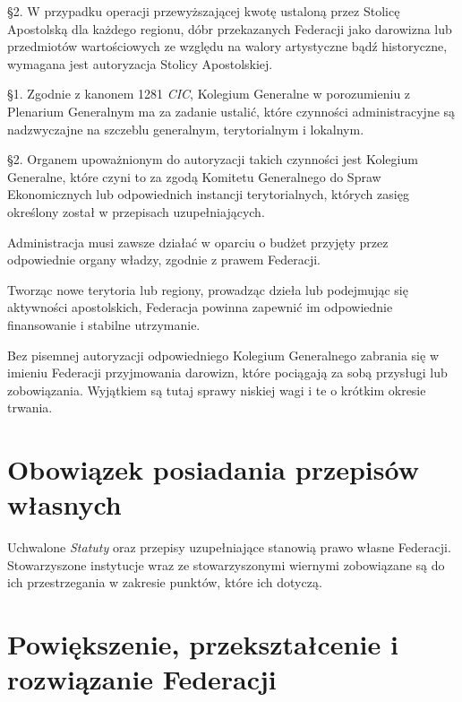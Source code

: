 \S{}2. W przypadku operacji przewyższającej kwotę ustaloną przez Stolicę Apostolską dla każdego regionu, dóbr przekazanych Federacji jako darowizna lub przedmiotów wartościowych ze względu na walory artystyczne bądź historyczne, wymagana jest autoryzacja Stolicy Apostolskiej.




 \S{}1. Zgodnie z kanonem 1281  {\em CIC}, Kolegium Generalne w porozumieniu z Plenarium Generalnym ma za zadanie ustalić, które czynności administracyjne są nadzwyczajne na szczeblu generalnym, terytorialnym i lokalnym.


\S{}2. Organem upoważnionym do autoryzacji takich czynności jest Kolegium Generalne, które czyni to za zgodą Komitetu Generalnego do Spraw Ekonomicznych lub odpowiednich instancji terytorialnych, których zasięg określony został w przepisach uzupełniających.
 


 Administracja musi zawsze działać w oparciu o budżet przyjęty przez odpowiednie organy władzy, zgodnie z prawem Federacji.
 


 Tworząc nowe terytoria lub regiony, prowadząc dzieła lub podejmując się aktywności apostolskich, Federacja powinna zapewnić im odpowiednie finansowanie i stabilne utrzymanie.
 
\filbreak{}

 Bez pisemnej autoryzacji odpowiedniego Kolegium Generalnego zabrania się w imieniu Federacji przyjmowania darowizn, które pociągają za sobą przysługi lub zobowiązania. Wyjątkiem są tutaj sprawy niskiej wagi i te o krótkim okresie trwania.






\chapter{Obowiązek posiadania przepisów własnych}


 Uchwalone {\em Statuty} oraz przepisy uzupełniające stanowią prawo własne Federacji. Stowarzyszone instytucje wraz ze stowarzyszonymi wiernymi zobowiązane są do ich przestrzegania w zakresie punktów, które ich dotyczą.


\chapter{Powiększenie, przekształcenie i rozwiązanie Federacji}


